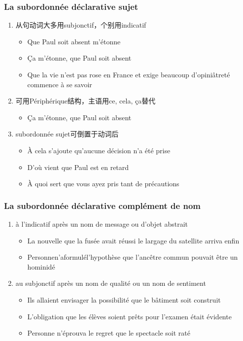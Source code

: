 \documentclass[UTF8]{report}
\begin{document}
\subsubsection{La subordonnée déclarative sujet}
\begin{enumerate}
    \item 从句动词大多用subjonctif，个别用indicatif
    \begin{itemize}
        \item Que Paul soit absent m'étonne
        \item Ça m'étonne, que Paul soit absent
        \item Que la vie n'est pas rose en France et exige beaucoup d'opiniâtreté commence à se savoir
    \end{itemize}
    \item 可用Périphérique结构，主语用ce, cela, ça替代
    \begin{itemize}
        \item Ça m’étonne, que Paul soit absent
    \end{itemize}
    \item subordonnée sujet可倒置于动词后
    \begin{itemize}
        \item À cela s’ajoute qu’aucune décision n’a été prise
        \item D’où vient que Paul est en retard
        \item À quoi sert que vous ayez pris tant de précautions
    \end{itemize}
\end{enumerate}


\subsubsection{La subordonnée déclarative complément de nom}
\begin{enumerate}
    \item à l’indicatif après un nom de message ou d’objet abstrait
    \begin{itemize}
        \item La nouvelle que la fusée avait réussi le largage du satellite arriva enfin
        \item Personnen’aformulél’hypothèse que l’ancêtre commun pouvait être un hominidé
    \end{itemize}
    \item au subjonctif après un nom de qualité ou un nom de sentiment
    \begin{itemize}
        \item Ils allaient envisager la possibilité que le bâtiment soit construit
        \item L’obligation que les élèves soient prêts pour l’examen était évidente
        \item Personne n’éprouva le regret que le spectacle soit raté
    \end{itemize}
\end{enumerate}
\end{document}
